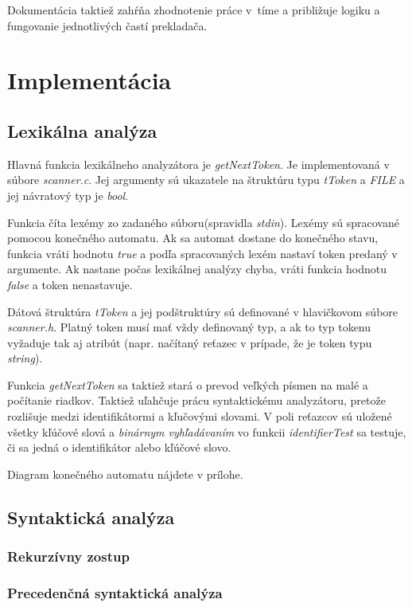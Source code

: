 \documentclass{article}
\begin{document}
        Dokumentácia taktiež zahŕňa zhodnotenie práce v~tíme a približuje logiku a fungovanie
        jednotlivých častí prekladača. 
    
    \section{Implementácia}
    
        \subsection{Lexikálna analýza}
        Hlavná funkcia lexikálneho analyzátora je \emph{getNextToken}. Je implementovaná v súbore \emph{scanner.c}.
        Jej argumenty sú ukazatele na štruktúru typu \emph{tToken} a \emph{FILE} a jej návratový typ je \emph{bool}. 

        Funkcia číta lexémy zo zadaného súboru(spravidla \emph{stdin}). Lexémy sú spracované pomocou konečného automatu. 
        Ak sa automat dostane do konečného stavu, funkcia vráti hodnotu \emph{true} a podľa spracovaných lexém nastaví
        token predaný v argumente. Ak nastane počas lexikálnej analýzy chyba, vráti funkcia hodnotu \emph{false} a 
        token nenastavuje. 

        Dátová štruktúra \emph{tToken} a jej podštruktúry sú definované v hlavičkovom súbore \emph{scanner.h}. 
        Platný token musí mať vždy definovaný typ, a ak to typ tokenu vyžaduje tak aj atribút 
        (napr. načítaný reťazec v prípade, že je token typu \emph{string}). 

        Funkcia \emph{getNextToken} sa taktiež stará o prevod veľkých písmen na malé a počítanie riadkov.
        Taktiež uľahčuje prácu syntaktickému analyzátoru, pretože rozlišuje medzi identifikátormi a kľučovými slovami.
        V poli reťazcov sú uložené všetky kľúčové slová a \emph{binárnym vyhľadávaním} vo funkcii \emph{identifierTest} 
        sa testuje, či sa jedná o identifikátor alebo kľúčové slovo.

        Diagram konečného automatu nájdete v prílohe.

        \subsection{Syntaktická analýza}
            \subsubsection{Rekurzívny zostup}
            \subsubsection{Precedenčná syntaktická analýza}
    
\end{document}
